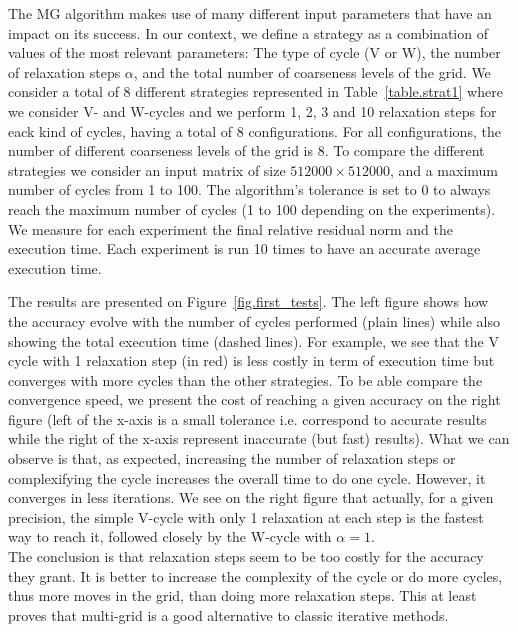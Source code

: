 The MG algorithm makes use of many different input parameters that have an impact on its success.
In our context, we define a strategy as a combination of values of the most relevant parameters: The type of cycle (V or W), the number of relaxation steps $\alpha$, and the total number of coarseness levels of the grid.
We consider a total of 8 different strategies represented in Table~\ref{table.strat1} where we consider V- and W-cycles and we perform 1, 2, 3 and 10 relaxation steps for eack kind of cycles, having a total of 8 configurations.
For all configurations, the number of different coarseness levels of the grid is 8.
To compare the different strategies we consider an input matrix of size $512000 \times 512000$,
and a maximum number of cycles from 1 to 100.
The algorithm's tolerance is set to $0$ to always reach the maximum number of cycles (1 to 100 depending on the experiments).
We measure for each experiment the final relative residual norm and the execution time.
Each experiment is run 10 times to have an accurate average execution time.

The results are presented on Figure~\ref{fig.first_tests}.
The left figure shows how the accuracy evolve with the number of cycles performed (plain lines) while also showing the total execution time (dashed lines). For example, we see that the V cycle with 1 relaxation step (in red) is less costly in term of execution time but converges with more cycles than the other strategies. To be able compare the convergence speed, we present the cost of reaching
a given accuracy on the right figure (left of the x-axis is a small tolerance i.e. correspond to accurate results while the right of the x-axis represent inaccurate (but fast) results).
What we can observe is that, as expected, increasing the number of relaxation steps or complexifying the cycle increases the overall time to do one cycle. However, it converges in less iterations.
We see on the right figure that actually, for a given precision, the simple V-cycle with only 1 relaxation at each step is the fastest way to reach it, followed closely by the W-cycle with $\alpha=1$.\\
The conclusion is that relaxation steps seem to be too costly for the accuracy they grant. It is better to increase the complexity of the cycle or do more cycles, thus more moves in the grid, than doing more relaxation steps. This at least proves
that multi-grid is a good alternative to classic iterative methods.
